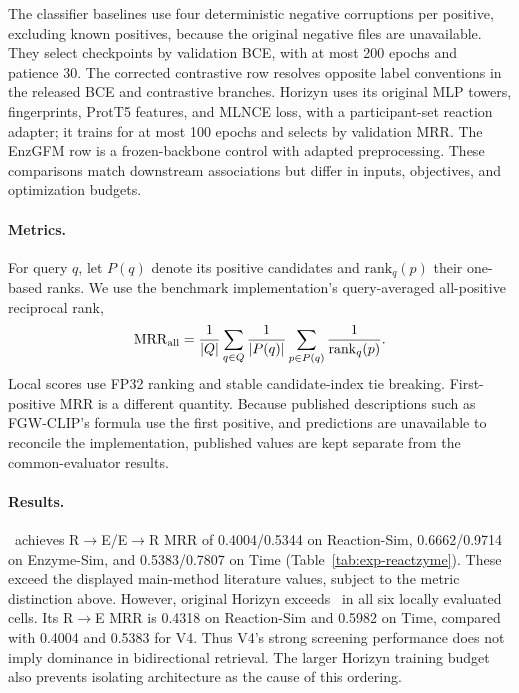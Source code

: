 The classifier baselines use four deterministic negative corruptions per
positive, excluding known positives, because the original negative files
are unavailable. They select checkpoints by validation BCE, with at most
200 epochs and patience 30. The corrected contrastive row resolves opposite
label conventions in the released BCE and contrastive branches. Horizyn
uses its original MLP towers, fingerprints, ProtT5 features, and MLNCE loss,
with a participant-set reaction adapter; it trains for at most 100 epochs
and selects by validation MRR. The EnzGFM row is a frozen-backbone control
with adapted preprocessing. These comparisons match downstream associations
but differ in inputs, objectives, and optimization budgets.

\paragraph{Metrics.}
For query $q$, let $P(q)$ denote its positive candidates and
$\mathrm{rank}_q(p)$ their one-based ranks. We use the benchmark
implementation's query-averaged all-positive reciprocal rank,
\begin{equation}
\mathrm{MRR}_{\rm all}=\frac{1}{|Q|}\sum_{q\in Q}
\frac{1}{|P(q)|}\sum_{p\in P(q)}\frac{1}{\mathrm{rank}_q(p)}.
\label{eq:exp-mrr}
\end{equation}
Local scores use FP32 ranking and stable candidate-index tie breaking.
First-positive MRR is a different quantity. Because published descriptions
such as FGW-CLIP's formula use the first positive, and predictions are
unavailable to reconcile the implementation, published values are kept
separate from the common-evaluator results.

\begin{table}[t]
\centering\small
\caption{ReactZyme retrieval. The upper group contains published MRR
($\dagger$); the lower group uses the shared all-positive evaluator in
Eq.~\ref{eq:exp-mrr}. Released-family rows use ESM2/MAT-2D; the EnzGFM
control uses MAT-2D. Training budgets and pretrained inputs differ. Bold
marks the best local value; display precision does not resolve very small
differences.}
\label{tab:exp-reactzyme}

\end{table}

\paragraph{Results.}
\methodname\ achieves R$\to$E/E$\to$R MRR of 0.4004/0.5344 on Reaction-Sim,
0.6662/0.9714 on Enzyme-Sim, and 0.5383/0.7807 on Time
(Table~\ref{tab:exp-reactzyme}). These exceed the displayed main-method
literature values, subject to the metric distinction above. However,
original Horizyn exceeds \methodname\ in all six locally evaluated
cells. Its R$\to$E MRR is 0.4318 on Reaction-Sim and 0.5982 on Time,
compared with 0.4004 and 0.5383 for V4.
Thus V4's strong screening performance does not imply dominance in
bidirectional retrieval. The larger Horizyn training budget also prevents
isolating architecture as the cause of this ordering.

